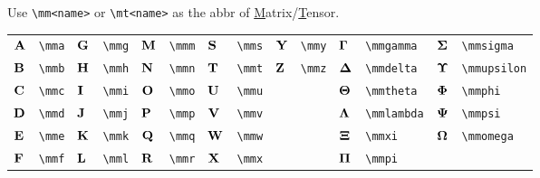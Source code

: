 \documentclass{article}
\begin{document}
Use \lstinline`\mm<name>` or \lstinline`\mt<name>` as the abbr of \underline{M}atrix/\underline{T}ensor.

\begin{tabular}{*{14}{l}}
${\mathbf A}$ & \lstinline`\mma` & ${\mathbf G}$ & \lstinline`\mmg` & ${\mathbf M}$ & \lstinline`\mmm` & ${\mathbf S}$ & \lstinline`\mms` & ${\mathbf Y}$ & \lstinline`\mmy` & ${\bm \Gamma}$ & \lstinline`\mmgamma` & ${\bm \Sigma}$ & \lstinline`\mmsigma`\\
${\mathbf B}$ & \lstinline`\mmb` & ${\mathbf H}$ & \lstinline`\mmh` & ${\mathbf N}$ & \lstinline`\mmn` & ${\mathbf T}$ & \lstinline`\mmt` & ${\mathbf Z}$ & \lstinline`\mmz` & ${\bm \Delta}$ & \lstinline`\mmdelta` & ${\bm \Upsilon}$ & \lstinline`\mmupsilon`\\
${\mathbf C}$ & \lstinline`\mmc` & ${\mathbf I}$ & \lstinline`\mmi` & ${\mathbf O}$ & \lstinline`\mmo` & ${\mathbf U}$ & \lstinline`\mmu` &  &  & ${\bm \Theta}$ & \lstinline`\mmtheta` & ${\bm \Phi}$ & \lstinline`\mmphi`\\
${\mathbf D}$ & \lstinline`\mmd` & ${\mathbf J}$ & \lstinline`\mmj` & ${\mathbf P}$ & \lstinline`\mmp` & ${\mathbf V}$ & \lstinline`\mmv` &  &  & ${\bm \Lambda}$ & \lstinline`\mmlambda` & ${\bm \Psi}$ & \lstinline`\mmpsi`\\
${\mathbf E}$ & \lstinline`\mme` & ${\mathbf K}$ & \lstinline`\mmk` & ${\mathbf Q}$ & \lstinline`\mmq` & ${\mathbf W}$ & \lstinline`\mmw` &  &  & ${\bm \Xi}$ & \lstinline`\mmxi` & ${\bm \Omega}$ & \lstinline`\mmomega`\\
${\mathbf F}$ & \lstinline`\mmf` & ${\mathbf L}$ & \lstinline`\mml` & ${\mathbf R}$ & \lstinline`\mmr` & ${\mathbf X}$ & \lstinline`\mmx` &  &  & ${\bm \Pi}$ & \lstinline`\mmpi` & \\
\end{tabular}
\end{document}
